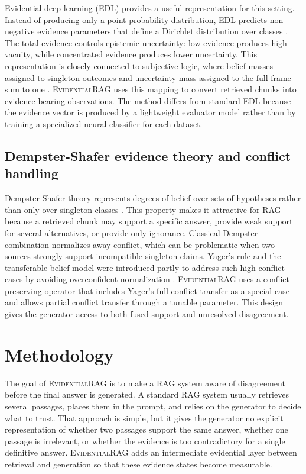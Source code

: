 \documentclass[preprint,12pt,authoryear,nopreprintline]{elsarticle}
\newcommand{\ERAG}{\textsc{EvidentialRAG}}
\begin{document}
Evidential deep learning (EDL) provides a useful representation for this setting. Instead of producing only a point probability distribution, EDL predicts non-negative evidence parameters that define a Dirichlet distribution over classes \citep{Sensoy2018EDL}. The total evidence controls epistemic uncertainty: low evidence produces high vacuity, while concentrated evidence produces lower uncertainty. This representation is closely connected to subjective logic, where belief masses assigned to singleton outcomes and uncertainty mass assigned to the full frame sum to one \citep{Josang2016SubjectiveLogic}. \ERAG{} uses this mapping to convert retrieved chunks into evidence-bearing observations. The method differs from standard EDL because the evidence vector is produced by a lightweight evaluator model rather than by training a specialized neural classifier for each dataset.

\subsection{Dempster-Shafer evidence theory and conflict handling}

Dempster-Shafer theory represents degrees of belief over sets of hypotheses rather than only over singleton classes \citep{Dempster1967,Shafer1976}. This property makes it attractive for RAG because a retrieved chunk may support a specific answer, provide weak support for several alternatives, or provide only ignorance. Classical Dempster combination normalizes away conflict, which can be problematic when two sources strongly support incompatible singleton claims. Yager's rule and the transferable belief model were introduced partly to address such high-conflict cases by avoiding overconfident normalization \citep{Yager1987,Smets1990}. \ERAG{} uses a conflict-preserving operator that includes Yager's full-conflict transfer as a special case and allows partial conflict transfer through a tunable parameter. This design gives the generator access to both fused support and unresolved disagreement.

\section{Methodology}
\label{sec:methodology}

The goal of \ERAG{} is to make a RAG system aware of disagreement before the final answer is generated. A standard RAG system usually retrieves several passages, places them in the prompt, and relies on the generator to decide what to trust. That approach is simple, but it gives the generator no explicit representation of whether two passages support the same answer, whether one passage is irrelevant, or whether the evidence is too contradictory for a single definitive answer. \ERAG{} adds an intermediate evidential layer between retrieval and generation so that these evidence states become measurable.
\end{document}
